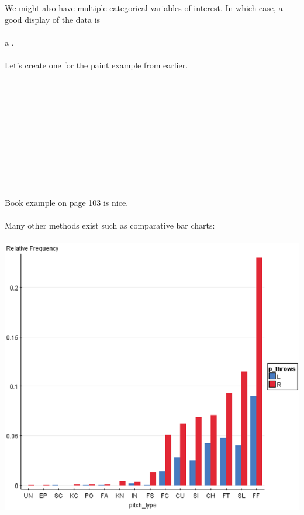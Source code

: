 \newpage

We might also have multiple categorical variables of interest.  In which case, a good display of the data is\\~\\
a \underbar{~~~~~~~~~~~~~~~~~~~~~~~~~~~~~~~~~~~~~~~~~~~~~~~~~~~~~}.\\~\\
Let's create one for the paint example from earlier.\\~\\~\\~\\~\\~\\~\\~\\~\\~\\~\\~\\

Book example on page 103 is nice.  \\~\\

Many other methods exist such as comparative bar charts:\\~\\
\includegraphics[scale=0.5]{bargraph2}\\~\\

